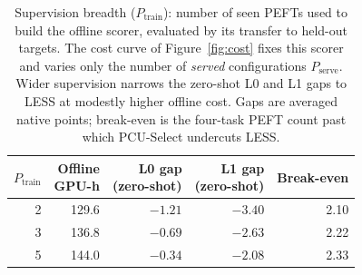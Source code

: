 \begin{table}[t]
\centering
\small
\setlength{\tabcolsep}{4pt}
\caption{Supervision breadth ($P_{\text{train}}$): number of seen PEFTs used to
build the offline scorer, evaluated by its transfer to held-out targets. The cost
curve of Figure~\ref{fig:cost} fixes this scorer and varies only the number of
\emph{served} configurations $P_{\text{serve}}$. Wider supervision narrows the
zero-shot L0 and L1 gaps to LESS at modestly higher offline cost. Gaps are
averaged native points; break-even is the four-task PEFT count past which
PCU-Select undercuts LESS.}
\label{tab:supervision-sweep}
\begin{tabular}{rrrrr}
\toprule
$P_{\text{train}}$ & \shortstack{Offline\\GPU-h} & \shortstack{L0 gap\\(zero-shot)} & \shortstack{L1 gap\\(zero-shot)} & Break-even \\
\midrule
2 & 129.6 & $-1.21$ & $-3.40$ & 2.10 \\
3 & 136.8 & $-0.69$ & $-2.63$ & 2.22 \\
5 & 144.0 & $-0.34$ & $-2.08$ & 2.33 \\
\bottomrule
\end{tabular}
\end{table}
